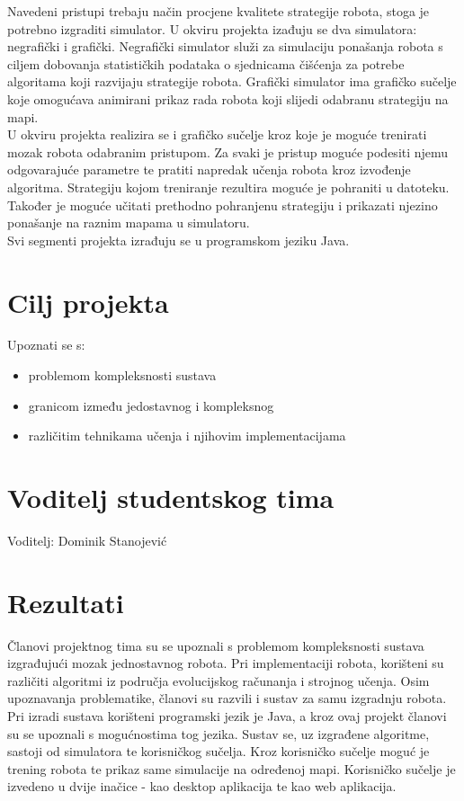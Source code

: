 \documentclass[times, utf8, numeric]{fer}
\begin{document}
\vspace{1ex}
Navedeni pristupi trebaju način procjene kvalitete strategije robota, stoga je potrebno izgraditi simulator. U okviru projekta izađuju se dva simulatora: negrafički i grafički. Negrafički simulator služi za simulaciju ponašanja robota s ciljem dobovanja statističkih podataka o sjednicama čišćenja za potrebe algoritama koji razvijaju strategije robota. Grafički simulator ima grafičko sučelje koje omogućava animirani prikaz rada robota koji slijedi odabranu strategiju na mapi.
\vspace{1ex}\\
U okviru projekta realizira se i grafičko sučelje kroz koje je moguće trenirati mozak robota odabranim pristupom. Za svaki je pristup moguće podesiti njemu odgovarajuće parametre te pratiti napredak učenja robota kroz izvođenje algoritma. Strategiju kojom treniranje rezultira moguće je pohraniti u datoteku. Također je moguće učitati prethodno pohranjenu strategiju i prikazati njezino ponašanje na raznim mapama u simulatoru.
\\
Svi segmenti projekta izrađuju se u programskom jeziku Java.

\section{Cilj projekta}
Upoznati se s:
\begin{itemize}
	\item problemom kompleksnosti sustava
	\item granicom između jedostavnog i kompleksnog
	\item različitim tehnikama učenja i njihovim implementacijama
\end{itemize}

\section{Voditelj studentskog tima}
Voditelj: Dominik Stanojević

\section{Rezultati}
Članovi projektnog tima su se upoznali s problemom kompleksnosti sustava izgrađujući mozak jednostavnog robota. Pri implementaciji robota, korišteni su različiti algoritmi iz područja evolucijskog računanja i strojnog učenja. Osim upoznavanja problematike, članovi su razvili i sustav za samu izgradnju robota. Pri izradi sustava korišteni programski jezik je Java, a kroz ovaj projekt članovi su se upoznali s mogućnostima tog jezika. Sustav se, uz izgrađene algoritme, sastoji od simulatora te korisničkog sučelja. Kroz korisničko sučelje moguć je trening robota te prikaz same simulacije na određenoj mapi. Korisničko sučelje je izvedeno u dvije inačice - kao desktop aplikacija te kao web aplikacija.
\end{document}
